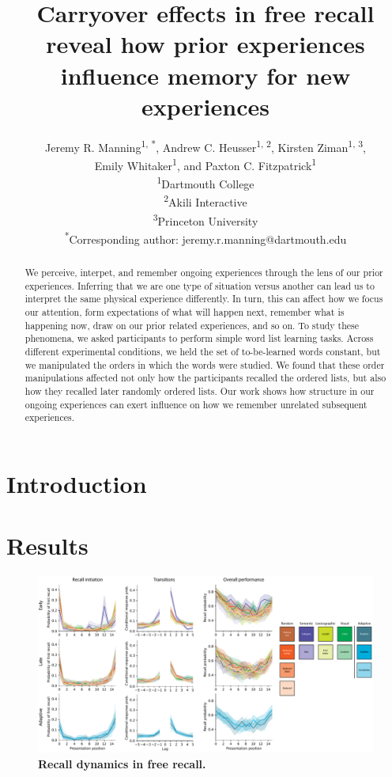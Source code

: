 \documentclass[10pt]{article}
\title{Carryover effects in free recall reveal how prior experiences influence memory for new experiences}
\author{Jeremy R. Manning\textsuperscript{1, *}, Andrew C. Heusser\textsuperscript{1, 2}, Kirsten Ziman\textsuperscript{1, 3},\\Emily Whitaker\textsuperscript{1}, and Paxton C. Fitzpatrick\textsuperscript{1}\\\textsuperscript{1}Dartmouth College\\\textsuperscript{2}Akili Interactive\\\textsuperscript{3}Princeton University\\\textsuperscript{*}Corresponding author: jeremy.r.manning@dartmouth.edu}
\date{}
\begin{document}
\maketitle

\begin{abstract}
We perceive, interpet, and remember ongoing experiences through the lens of our prior experiences.
Inferring that we are one type of situation versus another can lead us to interpret the same physical
experience differently.  In turn, this can affect how we focus our attention, form expectations of what will happen next, 
remember what is happening now, draw on our prior related experiences, and so on.  To study these phenomena,
we asked participants to perform simple word list learning tasks.  Across different experimental conditions, we held the set of
to-be-learned words constant, but we manipulated the orders in which the words were studied.  We found that 
these order manipulations affected not only how the participants recalled the ordered lists, but also how they recalled later randomly
ordered lists.  Our work shows how structure in our ongoing experiences can exert influence on how we remember unrelated
subsequent experiences.
\end{abstract}


\section*{Introduction}





\section*{Results}

\begin{figure}[tp]
    \centering
    \includegraphics[width=\textwidth]{figures/recall_dynamics}
    \caption{\textbf{Recall dynamics in free recall.}}
    \label{fig:recall-dynamics}
\end{figure}
\end{document}
